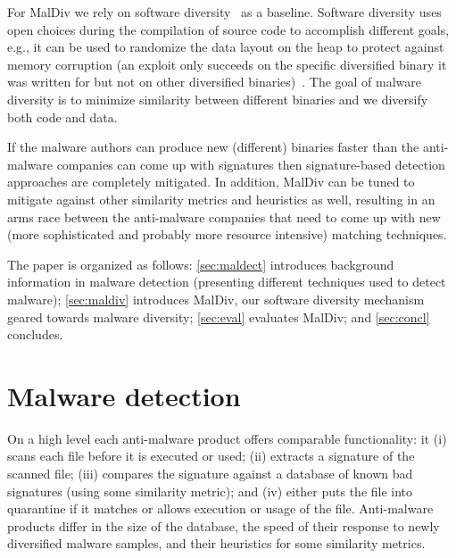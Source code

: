 \documentclass[10pt, preprint]{sigplanconf}
\begin{document}
For MalDiv we rely on software diversity~\cite{cohen93csec} as a baseline.
Software diversity uses open choices during the compilation of source code to
accomplish different goals, e.g., it can be used to randomize the data layout
on the heap to protect against memory corruption (an exploit only succeeds on
the specific diversified binary it was written for but not on other diversified
binaries)~\cite{cohen93csec, cox06usenix, forrest97hotos, franz10npsw,
kisserli07cobassa, multicompiler}. The goal of malware diversity is to minimize
similarity between different binaries and we diversify both code and data.

If the malware authors can produce new (different) binaries faster than the
anti-malware companies can come up with signatures then signature-based
detection approaches are completely mitigated. In addition, MalDiv can be tuned
to mitigate against other similarity metrics and heuristics as well, resulting
in an arms race between the anti-malware companies that need to come up with
new (more sophisticated and probably more resource intensive) matching
techniques.

The paper is organized as follows: \autoref{sec:maldect} introduces background
information in malware detection (presenting different techniques used to
detect malware); 
\autoref{sec:maldiv} introduces MalDiv, our software
diversity mechanism geared towards malware diversity; \autoref{sec:eval}
evaluates MalDiv; and \autoref{sec:concl} concludes.


%


\section{Malware detection}\label{sec:maldect}

On a high level each anti-malware product offers comparable functionality:
it (i) scans each file before it is executed or used; (ii) extracts a
signature of the scanned file; (iii) compares the signature against a database
of known bad signatures (using some similarity metric); and (iv) either puts
the file into quarantine if it matches or allows execution or usage of the
file. Anti-malware products differ in the size of the database, the speed of
their response to newly diversified malware samples, and their heuristics for
some similarity metrics.
\end{document}

